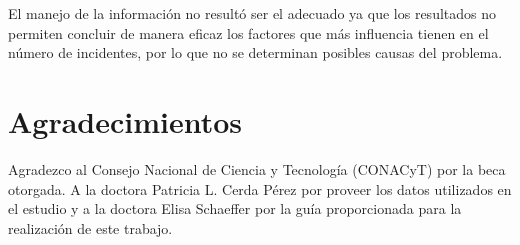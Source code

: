 \documentclass[final,5p,times]{elsarticle}
\begin{document}
El manejo de la informaci\'on no result\'o ser el adecuado ya que los resultados no permiten concluir de manera eficaz los factores que m\'as influencia tienen en el n\'umero de incidentes, por lo que no se determinan posibles causas del problema.











\section*{Agradecimientos}

Agradezco al Consejo Nacional de Ciencia y Tecnolog\'ia (CONACyT) por la beca otorgada. A la doctora Patricia L. Cerda P\'erez por proveer los datos utilizados en el estudio y a la doctora Elisa Schaeffer por la gu\'ia proporcionada para la realizaci\'on de este trabajo.


\end{document}

